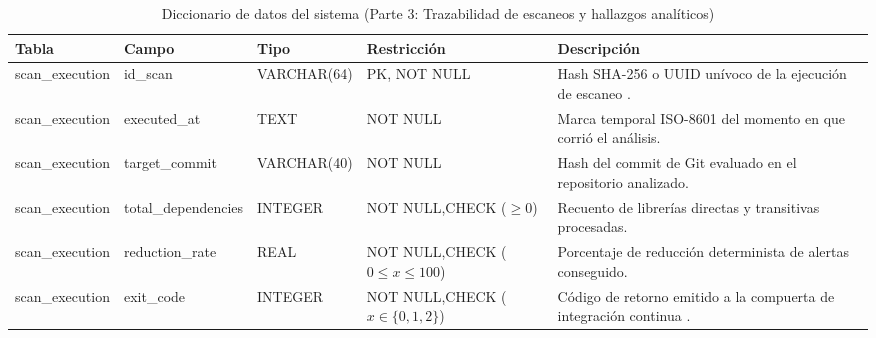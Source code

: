 \newpage

\begin{table}[H]
\centering
\caption{Diccionario de datos del sistema (Parte 3: Trazabilidad de escaneos y hallazgos analíticos)}
\label{p6:tab:diccionario_datos_p3}
\footnotesize
\singlespacing
\setlength{\tabcolsep}{3.5pt}
\begin{tabularx}{\textwidth}{>{\raggedright\arraybackslash}p{2.3cm} >{\raggedright\arraybackslash}p{2.5cm} >{\raggedright\arraybackslash}p{1.9cm} >{\raggedright\arraybackslash}p{2.7cm} >{\raggedright\arraybackslash}X}
\toprule
\textbf{Tabla} & \textbf{Campo} & \textbf{Tipo} & \textbf{Restricción} & \textbf{Descripción} \\
\midrule
scan\_\newline execution & id\_scan & VARCHAR\allowbreak (64) & PK, NOT NULL & Hash SHA-256 o UUID unívoco de la ejecución de escaneo \cite{torres2026proyecto}. \\
scan\_\newline execution & executed\_at & TEXT & NOT NULL & Marca temporal ISO-8601 del momento en que corrió el análisis. \\
scan\_\newline execution & target\_\newline commit & VARCHAR\allowbreak (40) & NOT NULL & Hash del commit de Git evaluado en el repositorio analizado. \\
scan\_\newline execution & total\_\newline dependencies & INTEGER & NOT NULL,\newline CHECK ($\ge 0$) & Recuento de librerías directas y transitivas procesadas. \\
scan\_\newline execution & reduction\_\newline rate & REAL & NOT NULL,\newline CHECK ($0 \le x \le 100$) & Porcentaje de reducción determinista de alertas conseguido. \\
scan\_\newline execution & exit\_code & INTEGER & NOT NULL,\newline CHECK ($x \in \{0,1,2\}$) & Código de retorno emitido a la compuerta de integración continua \cite{humble2010continuous}. \\

\end{tabularx}
\end{table}
